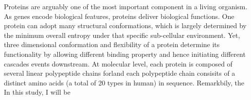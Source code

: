 Proteins are arguably one of the most important component in a living organism. As genes encode biological features, proteins deliver biological functions. One protein can adopt many structural conformations, which is largely determined by the minimum overall entropy under that specific sub-cellular environment. Yet, three dimensional conformation and flexibility of a protein determine its functionality by allowing different binding property and hence initiating different cascades events downstream. At molecular level, each protein is composed of several linear polypeptide chains forland each polypeptide chain consisits of a distinct amino acids (a total of 20 types in human) in sequence. Remarkbily, the  In this study, I will be 